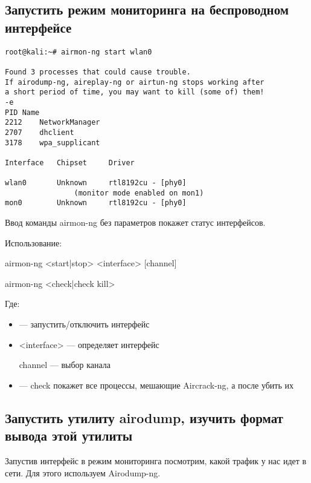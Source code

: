 \documentclass[utf8x, 12pt]{G7-32}
\begin{document}
\subsection{Запустить режим мониторинга на беспроводном интерфейсе}

\begin{lstlisting}
root@kali:~# airmon-ng start wlan0

Found 3 processes that could cause trouble.
If airodump-ng, aireplay-ng or airtun-ng stops working after
a short period of time, you may want to kill (some of) them!
-e 
PID	Name
2212	NetworkManager
2707	dhclient
3178	wpa_supplicant

Interface	Chipset		Driver

wlan0		Unknown 	rtl8192cu - [phy0]
				(monitor mode enabled on mon1)
mon0		Unknown 	rtl8192cu - [phy0]
\end{lstlisting}

Ввод команды airmon-ng без параметров покажет статус интерфейсов.


Использование:

airmon-ng <start|stop> <interface> [channel]

airmon-ng <check|check kill>

Где:

\begin{itemize}
	\item <start|stop> --- запустить/отключить интерфейс
	\item <interface> --- определяет интерфейс
	\item [channel] --- выбор канала
	\item <check|check kill> --- check покажет все процессы, мешающие Aircrack-ng, а после убить их
\end{itemize}



\subsection{Запустить утилиту airodump, изучить формат вывода этой утилиты}

Запустив интерфейс в режим мониторинга посмотрим, какой трафик у нас идет в сети. Для этого используем Airodump-ng.
\end{document}
